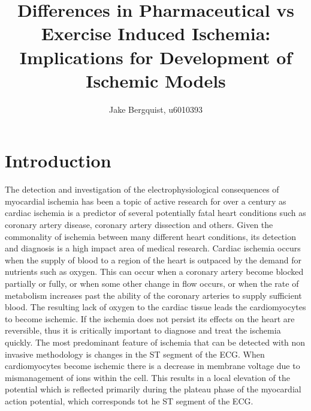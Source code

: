 \documentclass[12pt]{article}
\begin{document}
\title{Differences in Pharmaceutical vs Exercise Induced Ischemia: Implications for Development of Ischemic Models }

\author{Jake Bergquist, u6010393}
\maketitle

\section{Introduction}

The detection and investigation of the electrophysiological consequences of myocardial ischemia has been a topic of active research for over a century as cardiac ischemia is a predictor of several potentially fatal heart conditions such as coronary artery disease, coronary artery dissection and others.\cite{BLZ:Saf2018,BLZ:Jes2013,BLZ:Noe2017,BLZ:Jes2012,RSM:Par20} Given the commonality of ischemia between many different heart conditions, its detection and diagnosis is a high impact area of medical research. Cardiac ischemia occurs when the supply of blood to a region of the heart is outpaced by the demand for nutrients such as oxygen. This can occur when a coronary artery become blocked partially or fully, or when some other change in flow occurs, or when the rate of metabolism increases past the ability of the coronary arteries to supply sufficient blood. The resulting lack of oxygen to the cardiac tissue leads the cardiomyocytes to become ischemic. If the ischemia does not persist its effects on the heart are reversible, thus it is critically important to diagnose and treat the ischemia quickly. The most predominant feature of ischemia that can be detected with non invasive methodology is changes in the ST segment of the ECG.\cite{RSM:Jan86a} When cardiomyocytes become ischemic there is a decrease in membrane voltage due to  mismanagement of ions within the cell. This results in a local elevation of the potential which is reflected primarily during the plateau phase of the myocardial action potential, which corresponds tot he ST segment of the ECG.\cite{RSM:Jan80} 
\end{document}
